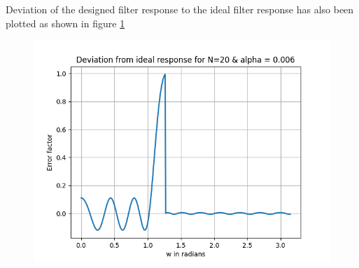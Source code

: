 \documentclass[conference]{IEEEtran}
\begin{document}
\begin{enumerate}[label=(\alph*)]
Deviation of the designed filter response to the ideal filter response has also been plotted as shown in figure \ref{fig:dev2}
\begin{figure}[!h]
	\begin{center} 
	    \includegraphics[width=0.7\columnwidth]{figs/dev/dev2}
	\end{center}
\caption{}
\label{fig:dev2}
\end{figure}

\newpage



\end{enumerate}
\end{document}
